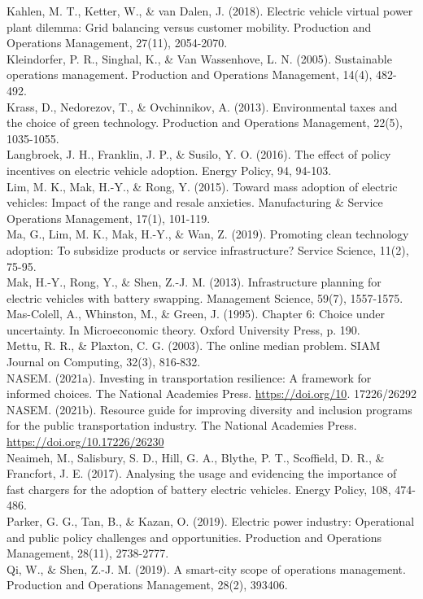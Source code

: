 \documentclass[10pt]{article}
\begin{document}
Kahlen, M. T., Ketter, W., \& van Dalen, J. (2018). Electric vehicle virtual power plant dilemma: Grid balancing versus customer mobility. Production and Operations Management, 27(11), 2054-2070.\\
Kleindorfer, P. R., Singhal, K., \& Van Wassenhove, L. N. (2005). Sustainable operations management. Production and Operations Management, 14(4), 482-492.\\
Krass, D., Nedorezov, T., \& Ovchinnikov, A. (2013). Environmental taxes and the choice of green technology. Production and Operations Management, 22(5), 1035-1055.\\
Langbroek, J. H., Franklin, J. P., \& Susilo, Y. O. (2016). The effect of policy incentives on electric vehicle adoption. Energy Policy, 94, 94-103.\\
Lim, M. K., Mak, H.-Y., \& Rong, Y. (2015). Toward mass adoption of electric vehicles: Impact of the range and resale anxieties. Manufacturing \& Service Operations Management, 17(1), 101-119.\\
Ma, G., Lim, M. K., Mak, H.-Y., \& Wan, Z. (2019). Promoting clean technology adoption: To subsidize products or service infrastructure? Service Science, 11(2), 75-95.\\
Mak, H.-Y., Rong, Y., \& Shen, Z.-J. M. (2013). Infrastructure planning for electric vehicles with battery swapping. Management Science, 59(7), 1557-1575.\\
Mas-Colell, A., Whinston, M., \& Green, J. (1995). Chapter 6: Choice under uncertainty. In Microeconomic theory. Oxford University Press, p. 190.\\
Mettu, R. R., \& Plaxton, C. G. (2003). The online median problem. SIAM Journal on Computing, 32(3), 816-832.\\
NASEM. (2021a). Investing in transportation resilience: A framework for informed choices. The National Academies Press. \href{https://doi.org/10}{https://doi.org/10}. 17226/26292\\
NASEM. (2021b). Resource guide for improving diversity and inclusion programs for the public transportation industry. The National Academies Press. \href{https://doi.org/10.17226/26230}{https://doi.org/10.17226/26230}\\
Neaimeh, M., Salisbury, S. D., Hill, G. A., Blythe, P. T., Scoffield, D. R., \& Francfort, J. E. (2017). Analysing the usage and evidencing the importance of fast chargers for the adoption of battery electric vehicles. Energy Policy, 108, 474-486.\\
Parker, G. G., Tan, B., \& Kazan, O. (2019). Electric power industry: Operational and public policy challenges and opportunities. Production and Operations Management, 28(11), 2738-2777.\\
Qi, W., \& Shen, Z.-J. M. (2019). A smart-city scope of operations management. Production and Operations Management, 28(2), 393406.
\end{document}
